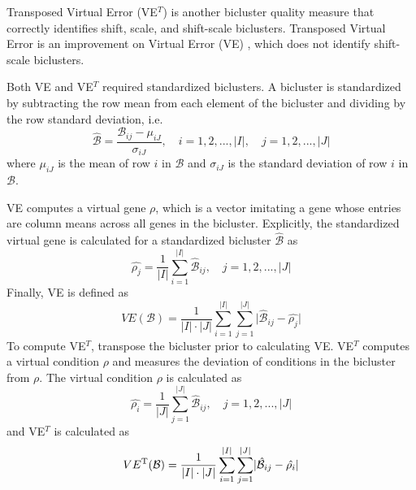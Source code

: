 Transposed Virtual Error (VE$^T$) \cite{pontes2010measuring} is another bicluster quality measure that correctly identifies shift, scale, and shift-scale biclusters. Transposed Virtual Error is an improvement on Virtual Error (VE) \cite{pontes2007virtual}, which does not identify shift-scale biclusters.

Both VE and VE$^T$ required standardized biclusters. A bicluster is standardized by subtracting the row mean from each element of the bicluster and dividing by the row standard deviation, i.e.
\begin{equation}\label{standardize_bicluster}
	\hat{\mathcal{B}} = \frac{\mathcal{B}_{ij} - \mu_{iJ}}{\sigma_{iJ}}, \quad i = 1, 2, ..., \lvert I \rvert, \quad j = 1, 2, ..., \lvert J \rvert
\end{equation}
where $\mu_{iJ}$ is the mean of row $i$ in $\mathcal{B}$ and $\sigma_{iJ}$ is the standard deviation of row $i$ in $\mathcal{B}$.

VE computes a virtual gene $\rho$, which is a vector imitating a gene whose entries are column means across all genes in the bicluster.  Explicitly, the standardized virtual gene is calculated for a standardized bicluster $\hat{\mathcal{B}}$ as
\begin{equation} \label{virtual_gene}
	\hat{\rho_{j}} = \frac{1}{\lvert I \rvert} \sum_{i=1}^{\lvert I \rvert} \hat{\mathcal{B}}_{ij}, \quad j = 1, 2, ..., \lvert J \rvert
\end{equation}
Finally, VE is defined as
\begin{equation}\label{ve}
	VE(\mathcal{B}) = \frac{1}{ \lvert I \rvert \cdot \lvert J \rvert } \sum_{i=1}^{\lvert I \rvert} \sum_{j=1}^{\lvert J \rvert} \lvert \hat{\mathcal{B}}_{ij} - \hat{\rho_j} \rvert
\end{equation}
To compute VE$^T$, transpose the bicluster prior to calculating VE. VE$^T$ computes a virtual condition $\rho$ and measures the deviation of conditions in the bicluster from $\rho$. The virtual condition $\rho$ is calculated as
\begin{equation}\label{virtual_condition}
	\hat{\rho_{i}} = \frac{1}{\lvert J \rvert} \sum_{j=1}^{\lvert J \rvert} \hat{\mathcal{B}}_{ij}, \quad j = 1, 2, ..., \lvert J \rvert
\end{equation}
and VE$^T$ is calculated as
\begin{equation}
	VE\textsuperscript{T}(\mathcal{B}) = \frac{1}{ \lvert I \rvert \cdot \lvert J \rvert } \sum_{i=1}^{\lvert I \rvert} \sum_{j=1}^{\lvert J \rvert} \lvert \hat{\mathcal{B}}_{ij} - \hat{\rho_i} \rvert
\end{equation}


